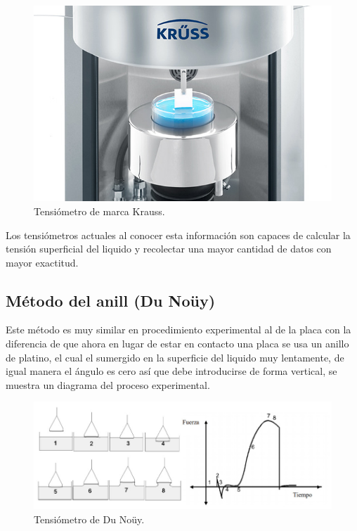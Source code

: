 \documentclass[10pt]{report}
\begin{document}
    \begin{figure}[h]
        \centering
        \includegraphics[scale=0.25]{./placaKrauss.jpg}
        \caption{Tensiómetro de marca Krauss.}
    \end{figure}

    Los tensiómetros actuales al conocer esta información son capaces de calcular la tensión superficial del liquido y recolectar una mayor cantidad de datos con mayor exactitud.


    \subsection*{Método del anill (Du Noüy)}

    Este método es muy similar en procedimiento experimental al de la placa con la diferencia de que ahora en lugar de estar en contacto una placa se usa un anillo de platino, el cual el sumergido en la superficie del liquido muy lentamente, de igual manera el ángulo es cero así que debe introducirse de forma vertical, se muestra un diagrama del proceso experimental.

    \begin{figure}[h]
        \centering
        \includegraphics[scale=0.75]{./metodoAnillo.jpg}
        \caption{Tensiómetro de Du Noüy.}
    \end{figure}    
\end{document}
